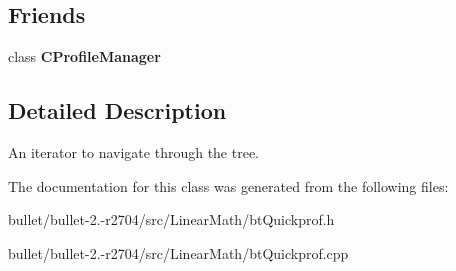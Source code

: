 \subsection*{Friends}
\begin{DoxyCompactItemize}
\item 
\hypertarget{class_c_profile_iterator_a7c8684494a3a73a8d3f19e229442b19a}{class {\bfseries C\+Profile\+Manager}}\label{class_c_profile_iterator_a7c8684494a3a73a8d3f19e229442b19a}

\end{DoxyCompactItemize}


\subsection{Detailed Description}
An iterator to navigate through the tree. 

The documentation for this class was generated from the following files\+:\begin{DoxyCompactItemize}
\item 
bullet/bullet-\/2.-\/r2704/src/\+Linear\+Math/bt\+Quickprof.\+h\item 
bullet/bullet-\/2.-\/r2704/src/\+Linear\+Math/bt\+Quickprof.\+cpp\end{DoxyCompactItemize}
